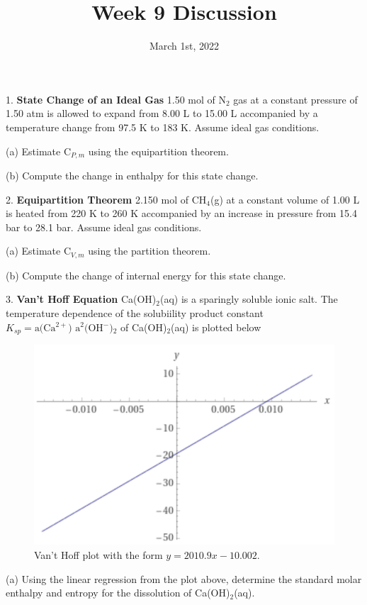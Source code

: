 \documentclass[10pt]{article}
\title{\textbf{Week 9 Discussion}}
\date{\vspace{-2em}March 1st, 2022}
\begin{document}
\maketitle

1. \textbf{State Change of an Ideal Gas} 1.50 mol of N$_2$ gas at a constant
pressure of 1.50 atm is allowed to expand from 8.00 L to 15.00 L accompanied
by a temperature change from 97.5 K to 183 K. Assume ideal gas conditions.

(a) Estimate C$_{P,m}$ using the equipartition theorem.

(b) Compute the change in enthalpy for this state change.

2. \textbf{Equipartition Theorem} 2.150 mol of CH$_4$(g) at a constant volume
of 1.00 L is heated from 220 K to 260 K accompanied by an increase in pressure
from 15.4 bar to 28.1 bar. Assume ideal gas conditions.

(a) Estimate C$_{V,m}$ using the partition theorem.

(b) Compute the change of internal energy for this state change.

3. \textbf{Van't Hoff Equation} Ca(OH)$_2$(aq) is a sparingly soluble ionic salt. The
temperature dependence of the solubiility product constant $K_{sp} = \text{a(Ca$^{2+}$)
  a$^2$(OH$^-$)$_2$}$ of Ca(OH)$_2$(aq) is plotted below

\begin{figure}[hbpt]
  \centering
  \includegraphics[scale=0.3]{vant_hoff.png}
  \caption{Van't Hoff plot with the form $y = 2010.9x - 10.002$.}
\end{figure}

(a) Using the linear regression from the plot above, determine the standard molar enthalpy
and entropy for the dissolution of Ca(OH)$_2$(aq).
\end{document}
